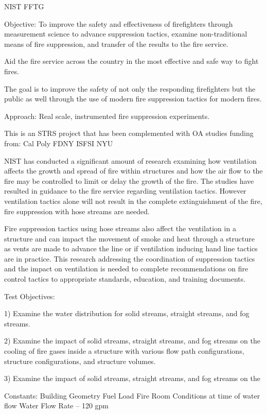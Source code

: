 \documentclass[12pt,oneside]{book}
\begin{document}
NIST FFTG

Objective: To improve the safety and effectiveness of firefighters through measurement science to advance suppression tactics, examine non-traditional means of fire suppression, and transfer of the results to the fire service. 

Aid the fire service across the country in the most effective and safe way to fight fires.

The goal is to improve the safety of not only the responding firefighters but the public as well through the use of modern fire suppression tactics for modern fires.

Approach: Real scale, instrumented fire suppression experiments. 

This is an STRS project that has been complemented with OA studies funding from: 
Cal Poly 
FDNY 
ISFSI 
NYU 

NIST has conducted a significant amount of research examining how ventilation affects the growth and spread of fire within structures and how the air flow to the fire may be controlled to limit or delay the growth of the fire.  The studies have resulted in guidance to the fire service regarding ventilation tactics.  However ventilation tactics alone will not result in the complete extinguishment of the fire, fire suppression with hose streams are needed.

Fire suppression tactics using hose streams also affect the ventilation in a structure and can impact the movement of smoke and heat through a structure as vents are made to advance the line or if ventilation inducing hand line tactics are in practice.  This research addressing the coordination of suppression tactics and the impact on ventilation is needed to complete recommendations on fire control tactics to appropriate standards, education, and training documents.

Test Objectives:

1)	Examine the water distribution for solid streams, straight streams, and fog streams.

2)	Examine the impact of solid streams, straight streams, and fog streams on the cooling of fire gases inside a structure with various flow path configurations, structure configurations, and structure volumes.

3)  Examine the impact of solid streams, straight streams, and fog streams on the 

Constants: 
Building Geometry
Fuel Load
Fire Room Conditions at time of water flow
Water Flow Rate – 120 gpm
\end{document}
